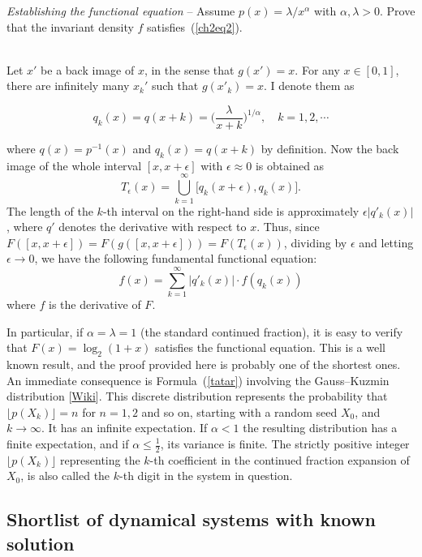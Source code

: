 \documentclass[oneside,10pt]{book}
\newcommand{\qed}{\nobreak \ifvmode \relax \else
      \ifdim\lastskip<1.5em \hskip-\lastskip
      \hskip1.5em plus0em minus0.5em \fi \nobreak
      \vrule height0.75em width0.5em depth0.25em\fi}
\begin{document}
\begin{Exercise}\label{exch2ex1} {\em Establishing the functional equation} -- Assume $p(x) = \lambda/x^\alpha$ with $\alpha,\lambda >0$. Prove that the invariant density $f$ satisfies~(\ref{ch2eq2}). \vspace{1ex}

 \\
Let $x'$ be a back image of $x$, in the sense that $g(x')=x$. For any $x\in [0,1]$, there are infinitely many  $x_k'$ such that
 $g(x'_k)=x$. I denote them as

$$q_k(x) = q(x+k) = \Big(\frac{\lambda}{x+k}\Big)^{1/\alpha}, \quad k=1,2,\cdots$$

\noindent where $q(x)=p^{-1}(x)$ and $q_k(x)=q(x+k)$ by definition. Now the back image of the whole interval $[x,x+\epsilon]$ with $\epsilon\approx 0$ is obtained as
$$ T_\epsilon(x) = \bigcup_{k=1}^\infty \Big[q_k(x+\epsilon),q_k(x)\Big].$$
The length of the $k$-th interval on the right-hand side is approximately $\epsilon |q'_k(x)|$, where $q'$ denotes the derivative with respect to $x$. Thus, since  $F([x,x+\epsilon]) = F(g([x,x+\epsilon])) = F(T_\epsilon(x))$, dividing by $\epsilon$ and letting $\epsilon\rightarrow 0$, we have the following fundamental functional equation:
$$f(x)=\sum_{k=1}^\infty |q'_k(x)|\cdot f(q_k(x))$$
where $f$ is the derivative of $F$.\qed

In particular, if $\alpha=\lambda=1$ (the standard continued fraction), it is easy to verify that $F(x)=\log_2(1+x)$ satisfies the functional equation. This is a well known result, and the proof provided here is probably one of the shortest ones. An immediate consequence is Formula~(\ref{tatar})
 involving the \textcolor{index}{Gauss–Kuzmin distribution} [\href{https://en.wikipedia.org/wiki/Gauss\%E2\%80\%93Kuzmin_distribution}{Wiki}]. This discrete distribution represents the probability that
$\lfloor  p(X_k) \rfloor =n$ for $n=1,2$ and so on, starting with a random seed $X_0$, and $k\rightarrow\infty$. It has an infinite expectation. If $\alpha<1$ the resulting distribution has a finite
 expectation, and if $\alpha\leq\frac{1}{2}$, its variance is finite. The strictly positive integer $\lfloor  p(X_k) \rfloor$ representing the $k$-th coefficient in
 the continued fraction expansion of $X_0$, is also called the $k$-th \textcolor{index}{digit} in the system in question.
\end{Exercise}

\subsection{Shortlist of dynamical systems with known solution}\label{bckdigt}
\end{document}
